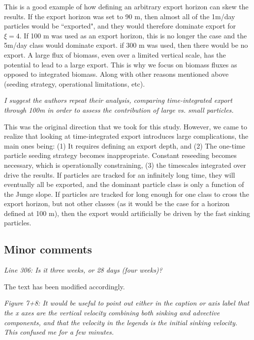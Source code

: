 \documentclass[12pt,letter]{article}
\begin{document}
{\color{blue}
	This is a good example of how defining an arbitrary export horizon can skew the results. If the export horizon was set to 90 m, then almost all of the 1m/day particles would be ``exported", and they would therefore dominate export for $\xi=4$. If 100 m was used as an export horizon, this is no longer the case and the 5m/day class would dominate export. if 300 m was used, then there would be no export. A large flux of biomass, even over a limited vertical scale, has the potential to lead to a large export. This is why we focus on biomass fluxes as opposed to integrated biomass. Along with other reasons mentioned above (seeding strategy, operational limitations, etc).\\}

\textit{I suggest the authors repeat their analysis, comparing time-integrated export through 100m in order to assess the contribution of large vs. small particles.}

{\color{blue}
This was the original direction that we took for this study. However, we came to realize that looking at time-integrated export introduces large complications, the main ones being: (1) It requires defining an export depth, and (2) The one-time particle seeding strategy becomes inappropriate. Constant reseeding becomes necessary, which is operationally constraining, (3) the timescales integrated over drive the results. If particles are tracked for an infinitely long time, they will eventually all be exported, and the dominant particle class is only a function of the Junge slope. If particles are tracked for long enough for one class to cross the export horizon, but not other classes (as it would be the case for a horizon defined at 100 m), then the export would artificially be driven by the fast sinking particles.}

\subsection*{Minor comments}
\textit{Line 306: Is it three weeks, or 28 days (four weeks)?}

{\color{blue}The text has been modified accordingly.\\}

\textit{Figure 7+8: It would be useful to point out either in the caption or axis label that the x axes are the vertical velocity combining both sinking and advective components, and that the velocity in the legends is the initial sinking velocity. This confused me for a few minutes.}
\end{document}
